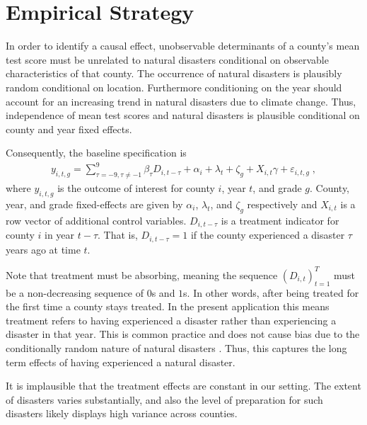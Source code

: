 
\section{Empirical Strategy}



In order to identify a causal effect, unobservable determinants of a county's mean test score must be unrelated to natural disasters conditional on observable characteristics of that county. The occurrence of natural disasters is plausibly random conditional on location. Furthermore conditioning on the year should account for an increasing trend in natural disasters due to climate change. Thus, independence of mean test scores and natural disasters is plausible conditional on county and year fixed effects.

Consequently, the baseline specification is
\begin{align} \label{baseline}
	y_{i, t, g} = \sum_{\tau = -9, \tau \neq -1}^{9} \beta_\tau D_{i, t-\tau} + \alpha_i + \lambda_t + \zeta_g + X_{i, t} \gamma + \varepsilon_{i, t, g} \;,
\end{align}
where $y_{i, t, g}$ is the outcome of interest for county $i$, year $t$, and grade $g$. County, year, and grade fixed-effects are given by $\alpha_i$, $\lambda_t$, and $\zeta_g$ respectively and $X_{i, t}$ is a row vector of additional control variables. $D_{i, t-\tau}$ is a treatment indicator for county $i$ in year $t-\tau$. That is, $D_{i, t-\tau} = 1$ if the county experienced a disaster $\tau$ years ago at time $t$.

Note that treatment must be absorbing, meaning the sequence $(D_{i, t})_{t=1}^T$ must be a non-decreasing sequence of $0$s and $1$s. In other words, after being treated for the first time a county stays treated. In the present application this means treatment refers to having experienced a disaster rather than experiencing a disaster in that year. This is common practice and does not cause bias due to the conditionally random nature of natural disasters \citep[see]{Deryugina_2017}. Thus, this captures the long term effects of having experienced a natural disaster.

It is implausible that the treatment effects are constant in our setting. The extent of disasters varies substantially, and also the level of preparation for such disasters likely displays high variance across counties. 


